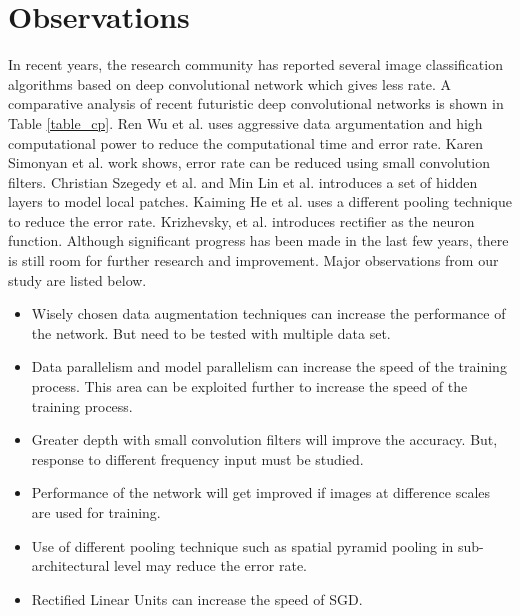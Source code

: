 \documentclass[a4paper]{article}
\begin{document}
 \section {Observations}
In recent years, the research community has reported several image classification algorithms based on deep convolutional network which gives less rate. A comparative analysis of recent futuristic deep convolutional networks is shown in Table \ref{table_cp}.
  Ren Wu et al. \cite{Wu2015} uses aggressive data argumentation and high computational power to reduce the computational time and error rate. Karen Simonyan et al. \cite{Arge2015} work shows, error rate can be reduced using small convolution filters. Christian Szegedy  et al. \cite{Szegedy} and Min Lin et al. \cite{Lin2013} introduces a set of hidden layers to model local patches. Kaiming He et al. \cite{He2014} uses a different pooling technique to reduce the error rate. Krizhevsky, et al. \cite{Krizhevsky2012a}  introduces  rectifier  as the neuron function. Although significant progress has been made in the last few years, there is still room for further research and improvement. Major observations from our study are listed below.
 \begin{itemize}
 \itemsep0em 
 \item  Wisely chosen data  augmentation techniques can increase the performance of the network. But need to be tested with multiple data set.
 \item Data parallelism and model parallelism can increase the speed of the training process. This area can be exploited further to increase the speed of the training process.
 \item Greater depth with small convolution filters will improve the accuracy. But, response to different frequency input must be studied.
 \item Performance of the network will get improved if images at difference scales are used for training.
 \item Use of different pooling technique such as spatial pyramid pooling in sub-architectural level may reduce the error rate. 
 \item Rectified Linear Units can increase the speed of SGD. 
 
 
 \end{itemize}
 
 
\end{document}
